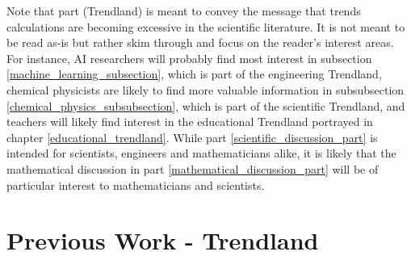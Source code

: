 \documentclass[11pt]{book}
\begin{document}
Note that part \ref{trendland_part} (Trendland) is meant to convey
the message that trends calculations are becoming excessive in the
scientific literature. It is not meant to be read as-is but rather
skim through and focus on the reader's interest areas. For instance,
AI researchers will probably find most interest in subsection \ref{machine_learning_subsection},
which is part of the engineering Trendland, chemical physicists are
likely to find more valuable information in subsubsection \ref{chemical_physics_subsubsection},
which is part of the scientific Trendland, and teachers will likely
find interest in the educational Trendland portrayed in chapter \ref{educational_trendland}.
While part \ref{scientific_discussion_part} is intended for scientists,
engineers and mathematicians alike, it is likely that the mathematical
discussion in part \ref{mathematical_discussion_part} will be of
particular interest to mathematicians and scientists.

 
 
 
 
 

 \printnomenclature{}

\part{Previous Work - Trendland}

\label{trendland_part}

 
\end{document}
